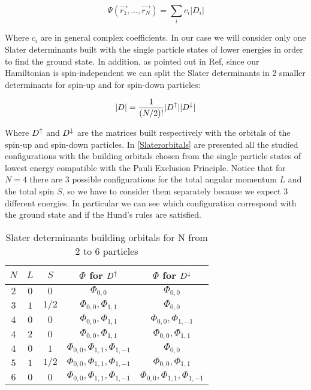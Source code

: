\begin{equation}
  \Psi(\vec{r_1},\dots,\vec{r_N})=\sum_i c_i |D_i|
\end{equation}

Where $c_i$ are in general complex coefficients.
In our case we will consider only one Slater determinants built with the single particle states of lower energies in order to find the ground state. %
In addition, as pointed out in Ref\cite{larsevind,notesOslo}, since our Hamiltonian is spin-independent we can split the Slater determinants in 2 smaller determinants for spin-up and for spin-down particles:

\begin{equation}
  |D|=\dfrac{1}{(N/2)!}|D^\uparrow||D^\downarrow|
\end{equation}

Where $D^\uparrow$ and $D^\downarrow$ are the matrices built respectively  with the orbitals of the spin-up and spin-down particles.
In \autoref{Slaterorbitals} are presented all the studied configurations with the building orbitals chosen from the single particle states of lowest energy compatible with the Pauli Exclusion Principle.
Notice that for $N=4$ there are 3 possible configurations for the total angular momentum $L$ and the total spin $S$, so we have to consider them separately because we expect 3 different energies.
In particular we can see which configuration correspond with the ground state and if the Hund's rules are satisfied.

\begin{table}[h]
  \centering
  \begin{tabular}{c|c|c|c|c}
    \toprule
    $N$ & $L$ & $S$ & $\Phi$ for $D^{\uparrow}$ & $\Phi$ for $D^{\downarrow}$ \\
    \hline
    $2$ & $0$ & $0$ & $\Phi_{0,0}$ & $\Phi_{0,0}$ \\
    $3$ & $1$ & $1/2$ & $\Phi_{0,0},\Phi_{1,1}$ & $\Phi_{0,0}$ \\
    $4$ & $0$ & $0$ & $\Phi_{0,0},\Phi_{1,1}$ & $\Phi_{0,0},\Phi_{1,-1}$ \\
    $4$ & $2$ & $0$ & $\Phi_{0,0},\Phi_{1,1}$ & $\Phi_{0,0},\Phi_{1,1}$ \\
    $4$ & $0$ & $1$ & $\Phi_{0,0},\Phi_{1,1},\Phi_{1,-1}$ & $\Phi_{0,0}$ \\
    $5$ & $1$ & $1/2$ & $\Phi_{0,0},\Phi_{1,1},\Phi_{1,-1}$ & $\Phi_{0,0},\Phi_{1,1}$ \\
    $6$ & $0$ & $0$ & $\Phi_{0,0},\Phi_{1,1},\Phi_{1,-1}$ & $\Phi_{0,0},\Phi_{1,1},\Phi_{1,-1}$ \\
    \bottomrule
  \end{tabular}
  \caption{Slater determinants building orbitals for N from 2 to 6 particles}
  \label{Slaterorbitals}
\end{table}

